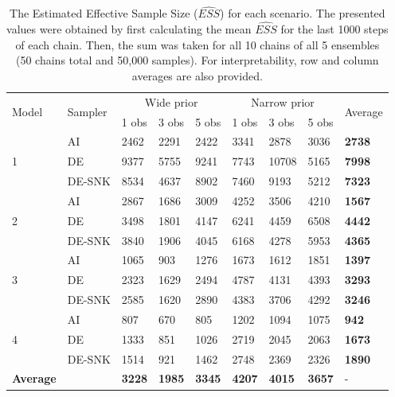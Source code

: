 \begin{table}[hbt]
\centering
\caption{The Estimated Effective Sample Size ($\widehat{ESS}$) for each scenario. The presented values were obtained by first calculating the mean $\widehat{ESS}$ for the last 1000 steps of each chain. Then, the sum was taken for all 10 chains of all 5 ensembles (50 chains total and 50,000 samples). For interpretability, row and column averages are also provided.}
\label{tab_ess_mean}
\begin{tabularx}{\textwidth}{llXXXXXXX}
\toprule
\multirow{2}{*}{Model} & \multirow{2}{*}{Sampler} & \multicolumn{3}{c}{Wide prior} & \multicolumn{3}{c}{Narrow prior} & \multirow{2}{*}{Average}\\
\cmidrule(lr){3-5} \cmidrule(lr){6-8} 
& & 1 obs & 3 obs & 5 obs & 1 obs & 3 obs & 5 obs & \\
\cmidrule(lr){1-2} \cmidrule(lr){3-5} \cmidrule(lr){6-8} \cmidrule(lr){9-9}
\multirow{3}{*}{1} & AI & 2462 & 2291 & 2422 & 3341 & 2878 & 3036 &  \textbf{2738} \\
& DE & 9377 & 5755 & 9241 & 7743 & 10708 & 5165 & \textbf{7998} \\
& DE-SNK & 8534 & 4637 & 8902 & 7460 & 9193 & 5212 & \textbf{7323}\\
\cmidrule(lr){1-2} \cmidrule(lr){3-5} \cmidrule(lr){6-8} \cmidrule(lr){9-9}
\multirow{3}{*}{2} & AI & 2867 & 1686 & 3009 & 4252 & 3506 & 4210 & \textbf{1567}\\
& DE & 3498 & 1801 & 4147 & 6241 & 4459 & 6508 & \textbf{4442}\\
& DE-SNK & 3840 & 1906 & 4045 & 6168 & 4278 & 5953 & \textbf{4365}\\
\cmidrule(lr){1-2} \cmidrule(lr){3-5} \cmidrule(lr){6-8} \cmidrule(lr){9-9}
\multirow{3}{*}{3} & AI & 1065 & 903 & 1276 & 1673 & 1612 & 1851 & \textbf{1397}\\
& DE & 2323 & 1629 & 2494 & 4787 & 4131 & 4393 & \textbf{3293} \\
& DE-SNK & 2585 & 1620 & 2890 & 4383 & 3706 & 4292 & \textbf{3246} \\
\cmidrule(lr){1-2} \cmidrule(lr){3-5} \cmidrule(lr){6-8} \cmidrule(lr){9-9}
\multirow{3}{*}{4} & AI & 807 & 670 & 805 & 1202 & 1094 & 1075 & \textbf{942}\\
& DE & 1333 & 851 & 1026 & 2719 & 2045 & 2063 & \textbf{1673}\\
& DE-SNK & 1514 & 921 & 1462 & 2748 & 2369 & 2326 & \textbf{1890}\\
\midrule
\textbf{Average} &  & \textbf{3228} & \textbf{1985} & \textbf{3345} & \textbf{4207} & \textbf{4015} & \textbf{3657} & - \\
\bottomrule
\end{tabularx}
\end{table}

